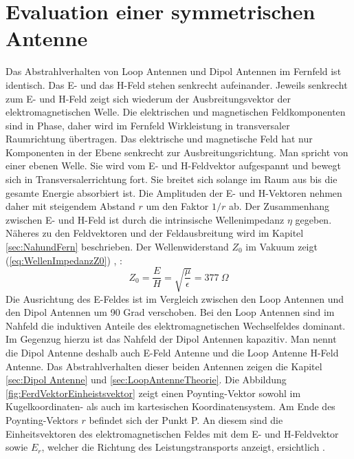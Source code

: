 
\newpage
\chapter{Evaluation einer symmetrischen Antenne}

Das Abstrahlverhalten von Loop Antennen und Dipol Antennen im Fernfeld ist identisch. Das E- und das H-Feld stehen senkrecht aufeinander. Jeweils senkrecht zum E- und H-Feld zeigt sich wiederum der Ausbreitungsvektor der elektromagnetischen Welle. Die elektrischen und magnetischen Feldkomponenten sind in Phase, daher wird im Fernfeld Wirkleistung in transversaler Raumrichtung
übertragen. Das elektrische und magnetische Feld hat nur Komponenten in der Ebene senkrecht zur Ausbreitungsrichtung. Man spricht von einer ebenen Welle. Sie wird vom E- und H-Feldvektor aufgespannt und bewegt sich in
Transversalerrichtung fort. Sie breitet sich solange im Raum aus bis die gesamte Energie absorbiert ist. Die Amplituden der E- und H-Vektoren nehmen daher mit steigendem Abstand $r$ um den Faktor $1/r$ ab. Der Zusammenhang zwischen E- und H-Feld ist durch die intrinsische Wellenimpedanz $\eta$ gegeben. Näheres zu den Feldvektoren und der Feldausbreitung wird im Kapitel \ref{sec:NahundFern} beschrieben. Der Wellenwiderstand $Z_0$ im Vakuum zeigt (\ref{eq:WellenImpedanzZ0}) \cite{Harrington-TimeHarmonic}, \cite{Emant}:
\begin{equation}\label{eq:WellenImpedanzZ0}
Z_{0}=\dfrac{E}{H}=\sqrt{\dfrac{\mu}{\epsilon}}=377\ \Omega
\end{equation}
Die Ausrichtung des E-Feldes ist im Vergleich zwischen den Loop Antennen und den Dipol Antennen um 90 Grad verschoben. Bei den Loop Antennen sind im Nahfeld die induktiven Anteile des elektromagnetischen Wechselfeldes dominant. Im Gegenzug hierzu ist das Nahfeld der Dipol Antennen kapazitiv. Man nennt die Dipol Antenne deshalb auch E-Feld Antenne und die Loop Antenne H-Feld Antenne. Das Abstrahlverhalten dieser beiden Antennen zeigen die Kapitel \ref{sec:Dipol Antenne} und \ref{sec:LoopAntenneTheorie}. Die Abbildung \ref{fig:FerdVektorEinheistsvektor} zeigt einen Poynting-Vektor sowohl im Kugelkoordinaten- als auch im kartesischen Koordinatensystem. Am Ende des Poynting-Vektors $r$ befindet sich der Punkt P. An diesem sind die Einheitsvektoren des elektromagnetischen Feldes mit dem E- und H-Feldvektor sowie ${E}_r$, welcher die Richtung des Leistungstransports anzeigt, ersichtlich \cite{Emant}. \\

